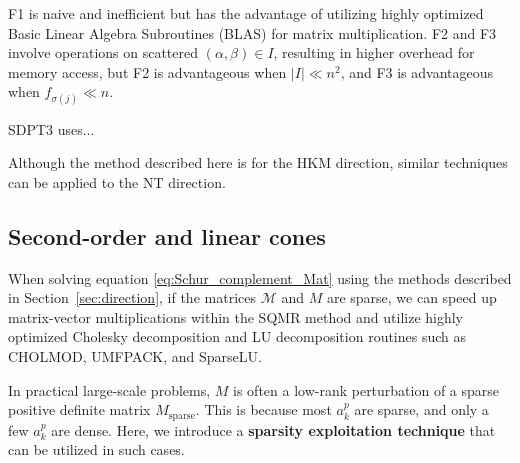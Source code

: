 \documentclass{scrartcl}
\begin{document}
\noindent
F1 is naive and inefficient but has the advantage of utilizing highly optimized Basic Linear Algebra Subroutines (BLAS) for matrix multiplication.
F2 and F3 involve operations on scattered $(\alpha,\beta) \in I$, resulting in higher overhead for memory access, but F2 is advantageous when $|I| \ll n^2$, and F3 is advantageous when $f_{\sigma(j)} \ll n$.

SDPT3 uses...

\medskip

Although the method described here is for the HKM direction, similar techniques can be applied to the NT direction.

\subsection{Second-order and linear cones} \label{sec:exploit_sparsity_socp_lp}
When solving equation \eqref{eq:Schur_complement_Mat} using the methods described in Section~\ref{sec:direction},
if the matrices $\mathcal{M}$ and $M$ are sparse, we can speed up matrix-vector multiplications within the SQMR method and utilize highly optimized Cholesky decomposition and LU decomposition routines such as CHOLMOD, UMFPACK, and SparseLU.

In practical large-scale problems, $M$ is often a low-rank perturbation of a sparse positive definite matrix $M_{\mathrm{sparse}}$. This is because most $a^p_k$ are sparse, and only a few $a^p_k$ are dense.
Here, we introduce a \textbf{sparsity exploitation technique} that can be utilized in such cases.
\end{document}
